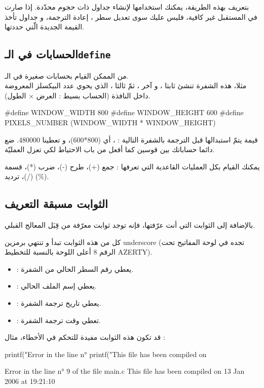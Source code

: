 بتعريف
بهذه الطريقة، يمكنك استخدامها لإنشاء جداول ذات حجوم محدّدة. إذا صارت في المستقبل غير كافية، فليس عليك سوى تعديل سطر
،
إعادة الترجمة، و جداول
تأخذ القيمة الجديدة الّتي حددتها.

\subsection{الحسابات في الـ\texttt{define}}
من الممكن القيام بحسابات صغيرة في الـ.\\
مثلا، هذه الشفرة تنشئ ثابتا
،
و آخر
،
ثمّ ثالثا
،
الذي يحوي عدد البيكسلز المعروضة داخل النافذة (الحساب بسيط : العرض $\times$ الطول).
\begin{Csource}
#define WINDOW_WIDTH 800
#define WINDOW_HEIGHT 600
#define PIXELS_NUMBER (WINDOW_WIDTH * WINDOW_HEIGHT)
\end{Csource}
قيمة
يتمّ استبدالها قبل الترجمة بالشفرة التالية :
،
أي (800*600)، و تعطينا 480000.
ضع دائما حساباتك بين قوسين كما أفعل من باب الاحتياط لكي تعزل العمليّة.

يمكنك القيام بكل العمليات القاعدية التي تعرفها : جمع (+)، طرح (-)، ضرب (*)، قسمة (/)، ترديد (\%).

\subsection{الثوابت مسبقة التعريف}
بالإضافة إلى الثوابت التي أنت عرّفتها، فإنه توجد ثوابت معرّفة من قِبَل المعالج القبلي.

كل من هذه الثوابت تبدأ و تنتهي برمزين
\textenglish{underscore} \InlineCode{\_}
(تجده في لوحة المفاتيح تحت الرقم 8 أعلى اللوحة بالنسبة للتخطيط
\textenglish{AZERTY}).
\begin{itemize}
  \item {} : يعطي رقم السطر الحالي من الشفرة.
  \item {} : يعطي إسم الملف الحالي.
  \item {} : يعطي تاريخ ترجمة الشفرة.
  \item {} : تعطي وقت ترجمة الشفرة.
\end{itemize}
قد تكون هذه الثوابت مفيدة للتحكم في الأخطاء، مثال :
\begin{Csource}
printf("Error in the line n° %
printf("This file has been compiled on %
\end{Csource}
\begin{Console}
Error in the line n° 9 of the file main.c
This file has been compiled on 13 Jan 2006 at 19:21:10
\end{Console}

